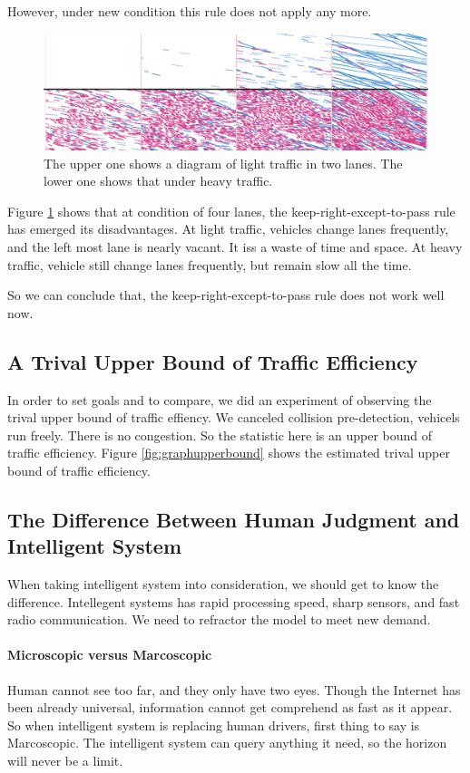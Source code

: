 However, under new condition this rule does not apply any more. 

\begin{figure}[H]
  \centering
  \includegraphics[width=.8\textwidth]{./img/keepright4bad.png}
  \caption{The upper one shows a diagram of light traffic in two lanes. The lower one shows that under heavy traffic. }
  \label{fig:keeprightgood}
\end{figure}
Figure \ref{fig:keeprightgood} shows that at condition of four lanes, the keep-right-except-to-pass rule has emerged its disadvantages.
At light traffic, vehicles change lanes frequently, and the left most lane is nearly vacant. 
It iss a waste of time and space. 
At heavy traffic, vehicle still change lanes frequently, but remain slow all the time. 

So we can conclude that, the keep-right-except-to-pass rule does not work well now. 

\subsection{A Trival Upper Bound of Traffic Efficiency}
In order to set goals and to compare, we did an experiment of observing the trival upper bound of traffic effiency. We canceled collision pre-detection, vehicels run freely. There is no congestion. So the statistic here is an upper bound of traffic efficiency. Figure \ref{fig:graphupperbound} shows the estimated trival upper bound of traffic efficiency. 

\subsection{The Difference Between Human Judgment and Intelligent System}
When taking intelligent system into consideration, we should get to know the difference. 
Intellegent systems has rapid processing speed, sharp sensors, and fast radio communication. 
We need to refractor the model to meet new demand. 
\paragraph{Microscopic versus Marcoscopic}
Human cannot see too far, and they only have two eyes. 
Though the Internet has been already universal, information cannot get comprehend as fast as it appear. 
So when intelligent system is replacing human drivers, first thing to say is Marcoscopic. 
The intelligent system can query anything it need, so the horizon will never be a limit. 

